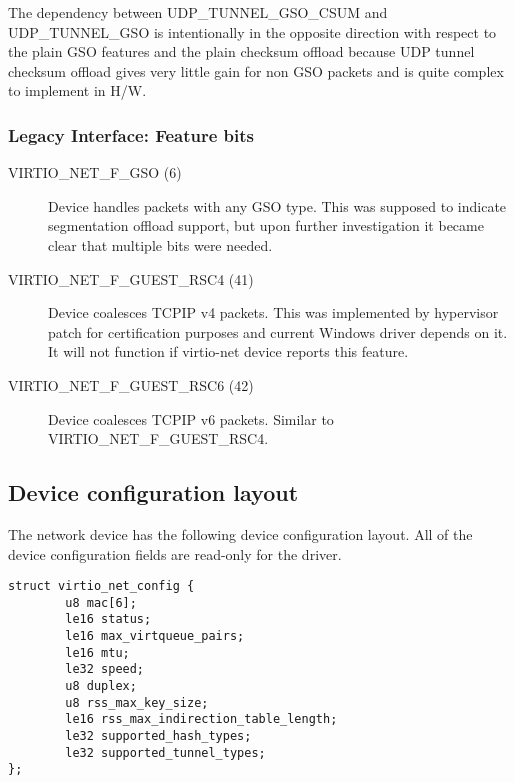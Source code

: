 \begin{note}
The dependency between UDP_TUNNEL_GSO_CSUM and UDP_TUNNEL_GSO is intentionally
in the opposite direction with respect to the plain GSO features and the plain
checksum offload because UDP tunnel checksum offload gives very little gain
for non GSO packets and is quite complex to implement in H/W.
\end{note}

\subsubsection{Legacy Interface: Feature bits}\label{sec:Device Types / Network Device / Feature bits / Legacy Interface: Feature bits}
\begin{description}
\item[VIRTIO_NET_F_GSO (6)] Device handles packets with any GSO type. This was supposed to indicate segmentation offload support, but
upon further investigation it became clear that multiple bits were needed.
\item[VIRTIO_NET_F_GUEST_RSC4 (41)] Device coalesces TCPIP v4 packets. This was implemented by hypervisor patch for certification
purposes and current Windows driver depends on it. It will not function if virtio-net device reports this feature.
\item[VIRTIO_NET_F_GUEST_RSC6 (42)] Device coalesces TCPIP v6 packets. Similar to VIRTIO_NET_F_GUEST_RSC4.
\end{description}

\subsection{Device configuration layout}\label{sec:Device Types / Network Device / Device configuration layout}
\label{sec:Device Types / Block Device / Feature bits / Device configuration layout}

The network device has the following device configuration layout.
All of the device configuration fields are read-only for the driver.

\begin{lstlisting}
struct virtio_net_config {
        u8 mac[6];
        le16 status;
        le16 max_virtqueue_pairs;
        le16 mtu;
        le32 speed;
        u8 duplex;
        u8 rss_max_key_size;
        le16 rss_max_indirection_table_length;
        le32 supported_hash_types;
        le32 supported_tunnel_types;
};
\end{lstlisting}

